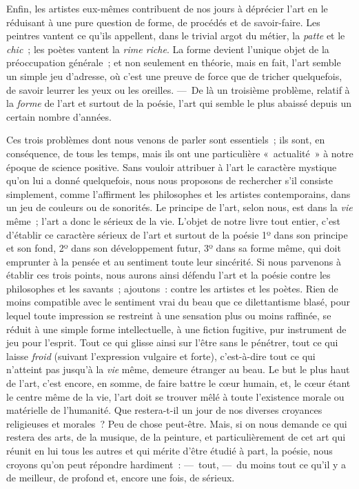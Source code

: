 \documentclass[french,twoside]{book} %
\begin{document}
Enfin, les artistes eux-mêmes contribuent de nos jours à déprécier l’art en le réduisant à une pure question de forme, de procédés et de savoir-faire. Les peintres vantent ce qu’ils appellent, dans le trivial argot du métier, la \emph{patte} et le \emph{chic} ; les poètes vantent la \emph{rime riche}. La forme devient l’unique objet de la préoccupation générale ; et non seulement en théorie, mais en fait, l’art semble un simple jeu d’adresse, où c’est une preuve de force que de tricher quelquefois, de savoir leurrer les yeux ou les oreilles. — De là un troisième problème, relatif à la \emph{forme} de l’art et surtout de la poésie, l’art qui semble le plus abaissé depuis un certain nombre d’années.\par
Ces trois problèmes dont nous venons de parler sont essentiels ; ils sont, en conséquence, de tous les temps, mais ils ont une particulière « actualité » à notre époque de science positive. Sans vouloir attribuer à l’art le caractère mystique qu’on lui a donné quelquefois, nous nous proposons de rechercher s’il consiste simplement, comme l’affirment les philosophes et les artistes contemporains, dans un jeu de couleurs ou de sonorités. Le principe de l’art, selon nous, est dans la \emph{vie} même ; l’art a donc le sérieux de la vie. L’objet de notre livre tout entier, c’est d’établir ce caractère sérieux de l’art et surtout de la poésie 1º dans son principe et son fond, 2º dans son développement futur, 3º dans sa forme même,  qui doit emprunter à la pensée et au sentiment toute leur sincérité. Si nous parvenons à établir ces trois points, nous aurons ainsi défendu l’art et la poésie contre les philosophes et les savants ; ajoutons : contre les artistes et les poètes. Rien de moins compatible avec le sentiment vrai du beau que ce dilettantisme blasé, pour lequel toute impression se restreint à une sensation plus ou moins raffinée, se réduit à une simple forme intellectuelle, à une fiction fugitive, pur instrument de jeu pour l’esprit. Tout ce qui glisse ainsi sur l’être sans le pénétrer, tout ce qui laisse \emph{froid} (suivant l’expression vulgaire et forte), c’est-à-dire tout ce qui n’atteint pas jusqu’à la \emph{vie} même, demeure étranger au beau. Le but le plus haut de l’art, c’est encore, en somme, de faire battre le cœur humain, et, le cœur étant le centre même de la vie, l’art doit se trouver mêlé à toute l’existence morale ou matérielle de l’humanité. Que restera-t-il un jour de nos diverses croyances religieuses et morales ? Peu de chose peut-être. Mais, si on nous demande ce qui restera des arts, de la musique, de la peinture, et particulièrement de cet art qui réunit en lui tous les autres et qui mérite d’être étudié à part, la poésie, nous croyons qu’on peut répondre hardiment : — tout, — du moins tout ce qu’il y a de meilleur, de profond et, encore une fois, de sérieux.
\end{document}
